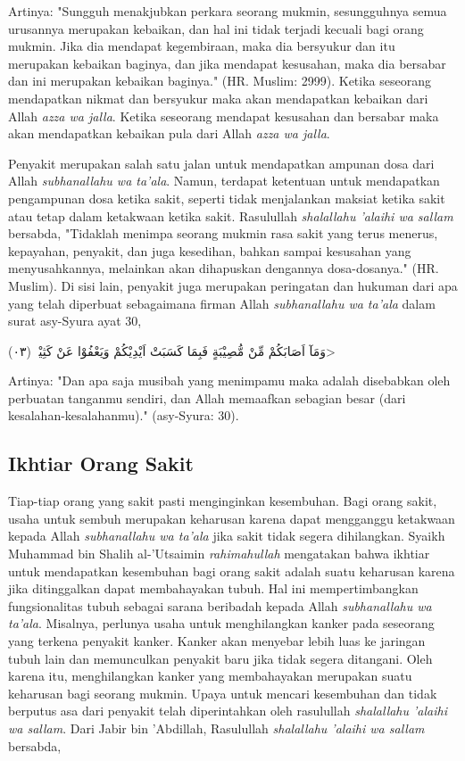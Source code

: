     Artinya: "Sungguh menakjubkan perkara seorang mukmin, sesungguhnya semua urusannya merupakan kebaikan, dan hal ini tidak terjadi kecuali bagi orang mukmin. Jika dia mendapat kegembiraan, maka dia bersyukur dan itu merupakan kebaikan baginya, dan jika mendapat kesusahan, maka dia bersabar dan ini merupakan kebaikan baginya." (HR. Muslim: 2999). Ketika seseorang mendapatkan nikmat dan bersyukur maka akan mendapatkan kebaikan dari Allah \textit{azza wa jalla}. Ketika seseorang mendapat kesusahan dan bersabar maka akan mendapatkan kebaikan pula dari Allah \textit{azza wa jalla}.

    Penyakit merupakan salah satu jalan untuk mendapatkan ampunan dosa dari Allah \textit{subhanallahu wa ta'ala}. Namun, terdapat ketentuan untuk mendapatkan pengampunan dosa ketika sakit, seperti tidak menjalankan maksiat ketika sakit atau tetap dalam ketakwaan ketika sakit. Rasulullah \textit{shalallahu 'alaihi wa sallam} bersabda, "Tidaklah menimpa seorang mukmin rasa sakit yang terus menerus, kepayahan, penyakit, dan juga kesedihan, bahkan sampai kesusahan yang menyusahkannya, melainkan akan dihapuskan dengannya dosa-dosanya." (HR. Muslim). Di sisi lain, penyakit juga merupakan peringatan dan hukuman dari apa yang telah diperbuat sebagaimana firman Allah \textit{subhanallahu wa ta'ala} dalam surat asy-Syura ayat 30,

    \begin{flushright}
        \<وَمَآ اَصَابَكُمْ مِّنْ مُّصِيْبَةٍ فَبِمَا كَسَبَتْ اَيْدِيْكُمْ وَيَعْفُوْا عَنْ كَثِيْرٍۗ (٠٣)>
    \end{flushright}

    Artinya: "Dan apa saja musibah yang menimpamu maka adalah disebabkan oleh perbuatan tanganmu sendiri, dan Allah memaafkan sebagian besar (dari kesalahan-kesalahanmu)." (asy-Syura: 30).

    \subsection{Ikhtiar Orang Sakit}
    Tiap-tiap orang yang sakit pasti menginginkan kesembuhan. Bagi orang sakit, usaha untuk sembuh merupakan keharusan karena dapat mengganggu ketakwaan kepada Allah \textit{subhanallahu wa ta'ala} jika sakit tidak segera dihilangkan. Syaikh Muhammad bin Shalih al-'Utsaimin \textit{rahimahullah} mengatakan bahwa ikhtiar untuk mendapatkan kesembuhan bagi orang sakit adalah suatu keharusan karena jika ditinggalkan dapat membahayakan tubuh. Hal ini mempertimbangkan fungsionalitas tubuh sebagai sarana beribadah kepada Allah \textit{subhanallahu wa ta'ala}. Misalnya, perlunya usaha untuk menghilangkan kanker pada seseorang yang terkena penyakit kanker. Kanker akan menyebar lebih luas ke jaringan tubuh lain dan memunculkan penyakit baru jika tidak segera ditangani. Oleh karena itu, menghilangkan kanker yang membahayakan merupakan suatu keharusan bagi seorang mukmin. Upaya untuk mencari kesembuhan dan tidak berputus asa dari penyakit telah diperintahkan oleh rasulullah \textit{shalallahu 'alaihi wa sallam}. Dari Jabir bin 'Abdillah, Rasulullah \textit{shalallahu 'alaihi wa sallam} bersabda,

